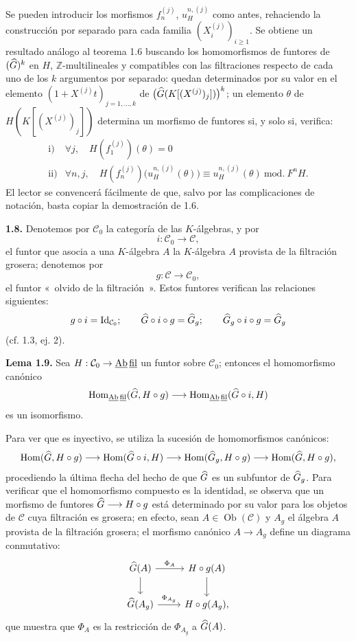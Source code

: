 Se pueden introducir los morfismos \(f_n^{(j)}\), \(u_H^{n,(j)}\) como antes, rehaciendo la construcción por separado para cada familia \((X_i^{(j)})_{i\geq 1}\). Se obtiene un resultado análogo al teorema 1.6 buscando los homomorfismos de funtores de \((\widehat G)^k\) en \(H\), \(\mathbb Z\)-multilineales y compatibles con las filtraciones respecto de cada uno de los \(k\) argumentos por separado: quedan determinados por su valor en el elemento
\((1+X^{(j)}t)_{j=1,\ldots,k}\) de \(\bigl(\widehat G(K[(X^{(j)})_j])\bigr)^k\); un elemento \(\theta\) de \(H(K[(X^{(j)})_j])\) determina un morfismo de funtores si, y solo si, verifica:
\[
\begin{array}{ll}
\text{i)}& \forall j,\quad H(f_1^{(j)})(\theta)=0\\[0.3em]
\text{ii)}& \forall n,j,\quad
H(f_n^{(j)})\bigl(u_H^{n,(j)}(\theta)\bigr)
\equiv u_H^{n,(j)}(\theta)\ \mathrm{mod.}\ F^nH.
\end{array}
\]
El lector se convencerá fácilmente de que, salvo por las complicaciones de notación, basta copiar la demostración de 1.6.

\textbf{1.8.} Denotemos por \(\mathcal C_0\) la categoría de las \(K\)-álgebras, y por
\[
  i:\mathcal C_0\longrightarrow \mathcal C,
\]
el funtor que asocia a una \(K\)-álgebra \(A\) la \(K\)-álgebra \(A\) provista de la filtración grosera; denotemos por
\[
  g:\mathcal C\longrightarrow\mathcal C_0,
\]
el funtor «~olvido de la filtración~». Estos funtores verifican las relaciones siguientes:
\[
  g\circ i=\operatorname{Id}_{\mathcal C_0};\qquad
  \widehat G\circ i\circ g=\widehat G_g;\qquad
  \widehat G_g\circ i\circ g=\widehat G_g
\]
(cf. 1.3, ej. 2).

\textbf{Lema 1.9.} Sea \(H:\mathcal C_0\to\underline{\mathrm{Ab}}\,\underline{\mathrm{fil}}\) un funtor sobre \(\mathcal C_0\); entonces el homomorfismo canónico
\[
  \operatorname{Hom}_{\underline{\mathrm{Ab}}\,\underline{\mathrm{fil}}}(\widehat G,H\circ g)
  \longrightarrow
  \operatorname{Hom}_{\underline{\mathrm{Ab}}\,\underline{\mathrm{fil}}}(\widehat G\circ i,H)
\]
es un isomorfismo.

Para ver que es inyectivo, se utiliza la sucesión de homomorfismos canónicos:
\[
  \operatorname{Hom}(\widehat G,H\circ g)\longrightarrow
  \operatorname{Hom}(\widehat G\circ i,H)\longrightarrow
  \operatorname{Hom}(\widehat G_g,H\circ g)\longrightarrow
  \operatorname{Hom}(\widehat G,H\circ g),
\]
procediendo la última flecha del hecho de que \(\widehat G\) es un subfuntor de \(\widehat G_g\). Para verificar que el homomorfismo compuesto es la identidad, se observa que un morfismo de funtores \(\widehat G\longrightarrow H\circ g\) está determinado por su valor para los objetos de \(\mathcal C\) cuya filtración es grosera; en efecto, sean \(A\in\operatorname{Ob}(\mathcal C)\) y \(A_g\) el álgebra \(A\) provista de la filtración grosera; el morfismo canónico \(A\to A_g\) define un diagrama conmutativo:
\[
\begin{tikzcd}
\Ghat(A) \arrow[r,"\Phi_A"] \arrow[d] &
H\circ g(A) \arrow[d]\\
\Ghat(A_g) \arrow[r,"\Phi_{A_g}"] &
H\circ g(A_g),
\end{tikzcd}
\]
que muestra que \(\Phi_A\) es la restricción de \(\Phi_{A_g}\) a \(\widehat G(A)\).

